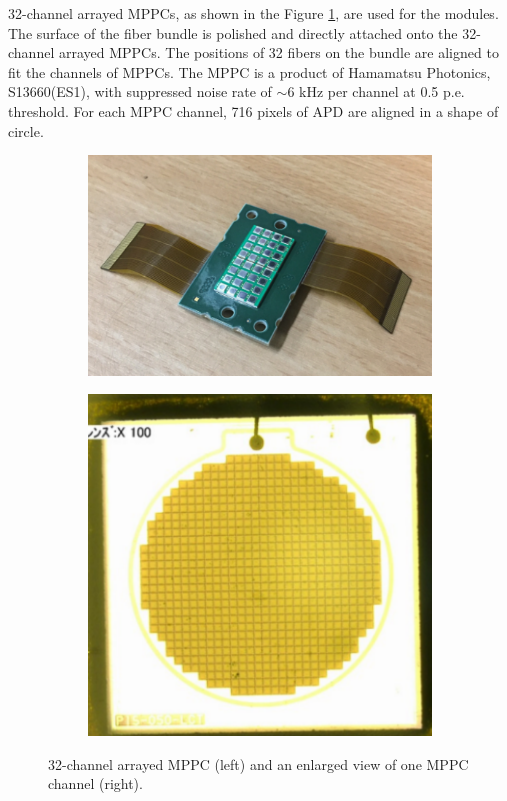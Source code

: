 32-channel arrayed MPPCs, as shown in the Figure \ref{fig:wagasci_mppc}, are used for the modules.
The surface of the fiber bundle is polished and directly attached onto the 32-channel arrayed MPPCs. The positions of 32 fibers on the bundle are aligned to fit the channels of MPPCs.
The MPPC is a product of Hamamatsu Photonics, S13660(ES1), with suppressed noise rate of $\sim$6 kHz per channel at 0.5 p.e. threshold.
For each MPPC channel, 716 pixels of APD are aligned in a shape of circle.

\begin{figure}[tbhp]
  \begin{center}
   \begin{subfigure}{0.48\textwidth}
     \includegraphics[width=\linewidth]{fig/32ch_array_mppc.pdf}
    \end{subfigure}
  \begin{subfigure}{0.38\textwidth}
      \includegraphics[width=\linewidth]{fig/enlarge_32ch_array_mppc.pdf}
    \end{subfigure}    
    \end{center}
  \caption{32-channel arrayed MPPC (left) and an enlarged view of one MPPC channel (right).}
\label{fig:wagasci_mppc}
\end{figure}


